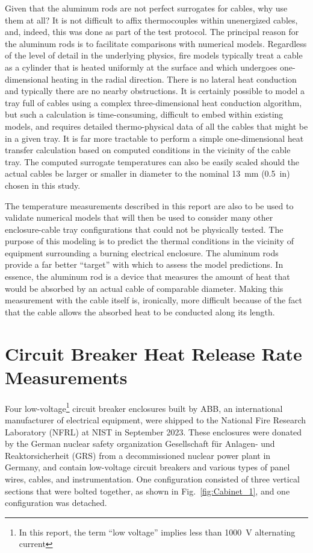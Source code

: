 Given that the aluminum rods are not perfect surrogates for cables, why use them at all? It is not difficult to affix thermocouples within unenergized cables, and, indeed, this was done as part of the test protocol. The principal reason for the aluminum rods is to facilitate comparisons with numerical models. Regardless of the level of detail in the underlying physics, fire models typically treat a cable as a cylinder that is heated uniformly at the surface and which undergoes one-dimensional heating in the radial direction. There is no lateral heat conduction and typically there are no nearby obstructions. It is certainly possible to model a tray full of cables using a complex three-dimensional heat conduction algorithm, but such a calculation is time-consuming, difficult to embed within existing models, and requires detailed thermo-physical data of all the cables that might be in a given tray. It is far more tractable to perform a simple one-dimensional heat transfer calculation based on computed conditions in the vicinity of the cable tray. The computed surrogate temperatures can also be easily scaled should the actual cables be larger or smaller in diameter to the nominal 13~mm (0.5~in) chosen in this study.

The temperature measurements described in this report are also to be used to validate numerical models that will then be used to consider many other enclosure-cable tray configurations that could not be physically tested. The purpose of this modeling is to predict the thermal conditions in the vicinity of equipment surrounding a burning electrical enclosure. The aluminum rods provide a far better ``target'' with which to assess the model predictions. In essence, the aluminum rod is a device that measures the amount of heat that would be absorbed by an actual cable of comparable diameter. Making this measurement with the cable itself is, ironically, more difficult because of the fact that the cable allows the absorbed heat to be conducted along its length.

\newpage

\section{Circuit Breaker Heat Release Rate Measurements}
\label{Sec:Circuit Breakers}

Four low-voltage\footnote{In this report, the term ``low voltage'' implies less than 1000~V alternating current} circuit breaker enclosures built by ABB, an international manufacturer of electrical equipment, were shipped to the National Fire Research Laboratory (NFRL) at NIST in September 2023. These enclosures were donated by the German nuclear safety organization Gesellschaft für Anlagen- und Reaktorsicherheit (GRS) from a decommissioned nuclear power plant in Germany, and contain low-voltage circuit breakers and various types of panel wires, cables, and instrumentation. One configuration consisted of three vertical sections that were bolted together, as shown in Fig.~\ref{fig:Cabinet_1}, and one configuration was detached.

